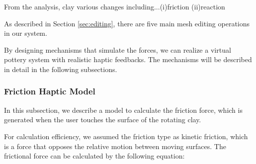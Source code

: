 \documentclass{svjour3}                     %
\begin{document}

From the analysis, clay various changes including...(i)friction (ii)reaction

As described in Section \ref{sec:editing}, there are five main mesh editing operations in our system.


By designing mechanisms that simulate the forces, we can realize a virtual pottery system with realistic haptic feedbacks.
The mechanisms will be described in detail in the following subsections.
























\subsubsection{Friction Haptic Model}








In this subsection, we describe a model to calculate the friction force, which is generated when the user touches the surface of the rotating clay.

For calculation efficiency, we assumed the friction type as kinetic friction, which is a force that opposes the relative motion between moving surfaces.
The frictional force can be calculated by the following equation:
\end{document}
